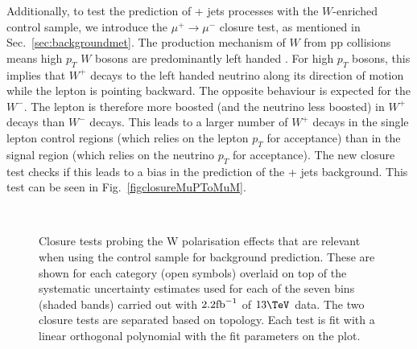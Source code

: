 Additionally, to 
test the prediction of \znunu + jets processes with
the $W$-enriched \mj control sample, we introduce the
$\mu^{+}\rightarrow\mu^{-}$ closure test, as mentioned in
Sec.~\ref{sec:backgroundmet}. The production mechanism of $W$ from pp
collisions means high $p_T$ $W$ bosons are predominantly left handed
\cite{WPol}.  For high $p_T$ bosons, this implies that $W^+$ decays to
the left handed neutrino along its direction of motion while the
lepton is pointing backward. The opposite behaviour is expected for
the $W^-$. The lepton is therefore more boosted (and the neutrino less
boosted) in $W^+$ decays than $W^-$ decays.  This leads to a larger
number of $W^+$ decays in the single lepton control regions (which
relies on the lepton $p_T$ for acceptance) than in the signal region
(which relies on the neutrino $p_T$ for acceptance). The new closure
test checks if this leads to a bias in the prediction of the \znunu +
jets background. This test can be seen in
Fig.~\ref{figclosureMuPToMuM}.

\begin{figure}[h!]
  \begin{center}
    ~~
    \caption{Closure tests probing the W polarisation effects that are
    relevant when using the \mj control sample for background
    prediction. These are shown for each
      \njet category (open symbols) overlaid on top of the systematic
      uncertainty estimates used for each of the seven \scalht bins
      (shaded bands) carried out with $2.2\ifb$ of $13\tev$
      data. The two closure tests are separated based on topology.
      Each test is fit with a linear orthogonal polynomial with the
      fit parameters on the plot.}
    \label{fig:closureMuPToMuM}
  \end{center} 
\end{figure}

